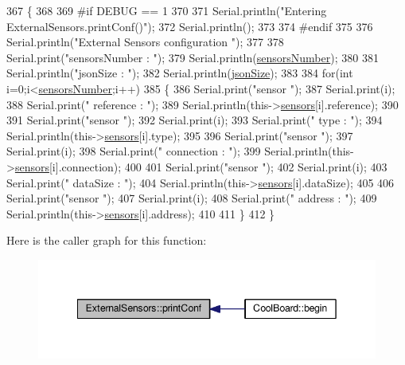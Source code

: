 \begin{DoxyCode}
367 \{
368 
369 \textcolor{preprocessor}{#if DEBUG == 1}
370 
371     Serial.println(\textcolor{stringliteral}{"Entering ExternalSensors.printConf()"});
372     Serial.println();
373 
374 \textcolor{preprocessor}{#endif }
375 
376     Serial.println(\textcolor{stringliteral}{"External Sensors configuration "});
377 
378     Serial.print(\textcolor{stringliteral}{"sensorsNumber : "});
379     Serial.println(\hyperlink{classExternalSensors_a58e4fbf9adeae787d92be5fa33043b5d}{sensorsNumber});
380 
381     Serial.println(\textcolor{stringliteral}{"jsonSize : "});
382     Serial.println(\hyperlink{classExternalSensors_acacea86d74d967b57fcff282d26cff57}{jsonSize});
383 
384     \textcolor{keywordflow}{for}(\textcolor{keywordtype}{int} i=0;i<\hyperlink{classExternalSensors_a58e4fbf9adeae787d92be5fa33043b5d}{sensorsNumber};i++)
385     \{
386         Serial.print(\textcolor{stringliteral}{"sensor "});
387         Serial.print(i);
388         Serial.print(\textcolor{stringliteral}{" reference : "});
389         Serial.println(this->\hyperlink{classExternalSensors_a284233f884fcf00154a44740cf1d9e1e}{sensors}[i].reference);
390 
391         Serial.print(\textcolor{stringliteral}{"sensor "});
392         Serial.print(i);
393         Serial.print(\textcolor{stringliteral}{" type : "});
394         Serial.println(this->\hyperlink{classExternalSensors_a284233f884fcf00154a44740cf1d9e1e}{sensors}[i].type);
395 
396         Serial.print(\textcolor{stringliteral}{"sensor "});
397         Serial.print(i);
398         Serial.print(\textcolor{stringliteral}{" connection : "});
399         Serial.println(this->\hyperlink{classExternalSensors_a284233f884fcf00154a44740cf1d9e1e}{sensors}[i].connection);
400         
401         Serial.print(\textcolor{stringliteral}{"sensor "});
402         Serial.print(i);
403         Serial.print(\textcolor{stringliteral}{" dataSize : "});
404         Serial.println(this->\hyperlink{classExternalSensors_a284233f884fcf00154a44740cf1d9e1e}{sensors}[i].dataSize);
405         
406         Serial.print(\textcolor{stringliteral}{"sensor "});
407         Serial.print(i);
408         Serial.print(\textcolor{stringliteral}{" address : "});
409         Serial.println(this->\hyperlink{classExternalSensors_a284233f884fcf00154a44740cf1d9e1e}{sensors}[i].address);
410     
411     \}
412 \}
\end{DoxyCode}
Here is the caller graph for this function\+:\nopagebreak
\begin{figure}[H]
\begin{center}
\leavevmode
\includegraphics[width=342pt]{classExternalSensors_a78c2bf55084435dd51d3c559b2d3c6f3_icgraph}
\end{center}
\end{figure}
